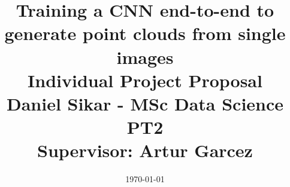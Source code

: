 \documentclass[a4paper,12pt]{article} %
\begin{document}
\title{%
  Training a CNN end-to-end to generate point clouds from single images\\
  \medskip
  \large Individual Project Proposal\\
    Daniel Sikar - MSc Data Science PT2\\
    Supervisor: Artur Garcez 
    }
\date{\today} %

\maketitle %



















\end{document}
